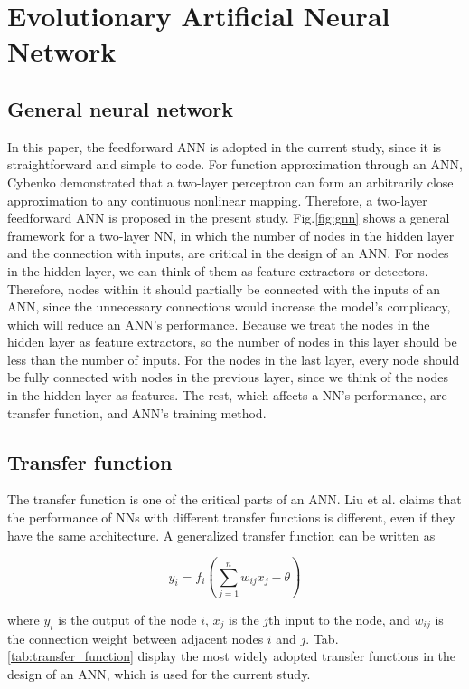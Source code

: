 \section{Evolutionary Artificial Neural Network}
\subsection{General neural network}
In this paper, the feedforward ANN is adopted in the current
study, since it is straightforward and simple to code. For function
approximation through an ANN, Cybenko demonstrated that a two-layer perceptron
can form an arbitrarily close approximation to any continuous nonlinear
mapping\cite{cybenko1989approximation}. Therefore, a two-layer feedforward ANN
is proposed in the present study. Fig.\ref{fig:gnn} shows a general framework for a
two-layer NN, in which the number of nodes in the hidden layer and the
connection with inputs, are critical in the design of an ANN. For nodes in the
hidden layer, we can think of them as feature extractors or detectors.
Therefore, nodes within it should partially be connected with the inputs of an ANN,
since the unnecessary connections would increase the model's complicacy, which
will reduce an ANN’s performance. Because we treat the nodes in the hidden layer
as feature extractors, so the number of nodes in this layer should be less than
the number of inputs. For the nodes in the last layer, every node should be
fully connected with nodes in the previous layer, since we think of the nodes
in the hidden layer as features. The rest, which affects a NN’s performance,
are transfer function, and ANN's training method.



\subsection{Transfer function}

The transfer function is one of the critical parts of an ANN. Liu
\cite{liu1996evolutionary} et al. claims that the performance of NNs with
different transfer functions is different, even if they have the same
architecture.  A generalized transfer function can be written as

\begin{equation}
	y_i = f_i(\sum_{j=1}^n{w_{ij}x_j - \theta})
\end{equation}

where $y_i$ is the output of the node $i$, $x_j$ is the $j$th input to the
node, and $w_{ij}$ is the connection weight between adjacent nodes $i$ and $j$.
Tab. \ref{tab:transfer_function} display the most widely adopted transfer
functions in the design of an ANN, which is used for the current study.

